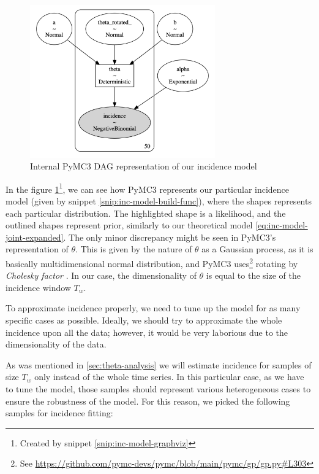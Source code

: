 \documentclass[
  digital, %
  oneside, %
  lof,     %
  lot,     %
]{fithesis4}
\begin{document}
\begin{figure}[H]
  \begin{center}
    \includegraphics[width=8cm]{static/images/inc-model-graphviz.png}
  \end{center}
  \caption{Internal PyMC3 DAG representation of our incidence model}
  \label{fig:inc-model-graphviz}
\end{figure}

In the figure \ref{fig:inc-model-graphviz}\footnote{Created by snippet \ref{snip:inc-model-graphviz}}, we can see how PyMC3 represents our particular incidence model (given by snippet \ref{snip:inc-model-build-func}), where the shapes represents each particular distribution.
The highlighted shape is a likelihood, and the outlined shapes represent prior, similarly to our theoretical model \ref{eq:inc-model-joint-expanded}.
The only minor discrepancy might be seen in PyMC3's representation of $\theta$.
This is given by the nature of $\theta$ as a Gaussian process, as it is basically multidimensional normal distribution, and PyMC3 uses\footnote{See \url{https://github.com/pymc-devs/pymc/blob/main/pymc/gp/gp.py\#L303}} rotating by \textit{Cholesky factor} \cite[Chapter 7]{murphy2021}.
In our case, the dimensionality of $\theta$ is equal to the size of the incidence window $T_w$.

To approximate incidence properly, we need to tune up the model for as many specific cases as possible. Ideally, we should try to approximate the whole incidence upon all the data; however, it would be very laborious due to the dimensionality of the data.

As was mentioned in \autoref{sec:theta-analysis} we will estimate incidence for samples of size $T_w$ only instead of the whole time series.
In this particular case, as we have to tune the model, those samples should represent various heterogeneous cases to ensure the robustness of the model.
For this reason, we picked the following samples for incidence fitting:
\end{document}
